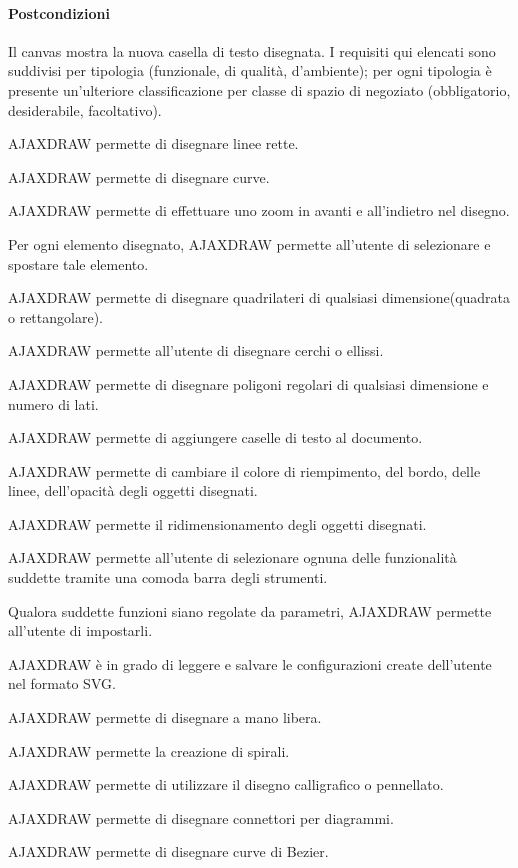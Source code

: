 \paragraph{Postcondizioni} Il canvas mostra la nuova casella di testo disegnata.
\label{listarequisiti}
I requisiti qui elencati sono suddivisi per tipologia (funzionale, di qualit\`a, d'ambiente); 
per ogni tipologia \`e presente un'ulteriore classificazione per classe di spazio di negoziato (obbligatorio, desiderabile, facoltativo). 
\begin{elenconumerato}{\subsubsecindent}
\item{AJAXDRAW permette di disegnare linee rette.}
\item{AJAXDRAW permette di disegnare curve.}
\item{AJAXDRAW permette di effettuare uno zoom in avanti e all'indietro nel disegno.}
\item{Per ogni elemento disegnato, AJAXDRAW permette all'utente di selezionare e spostare tale elemento.}
\item{AJAXDRAW permette di disegnare quadrilateri di qualsiasi dimensione(quadrata o rettangolare).}
\item{AJAXDRAW permette all'utente di disegnare cerchi o ellissi.}
\item{AJAXDRAW permette di disegnare poligoni regolari di qualsiasi dimensione e numero di lati.}
\item{AJAXDRAW permette di aggiungere caselle di testo al documento. }
\item{AJAXDRAW permette di cambiare il colore di riempimento, del bordo, delle linee, dell'opacità degli oggetti disegnati.}
\item{AJAXDRAW permette il ridimensionamento degli oggetti disegnati.}
\item{AJAXDRAW permette all'utente di selezionare ognuna delle funzionalit\`a suddette tramite una comoda barra degli strumenti.}
\item{Qualora suddette funzioni siano regolate da parametri, AJAXDRAW permette all'utente di impostarli.}
\item{AJAXDRAW \`e in grado di leggere e salvare le configurazioni create dell'utente nel formato SVG.}
\end{elenconumerato}

\begin{elenconumerato}{\subsubsecindent}
\item{AJAXDRAW permette di disegnare a mano libera.}
\item{AJAXDRAW permette la creazione di spirali.}
\item{AJAXDRAW permette di utilizzare il disegno calligrafico o pennellato.}
\item{AJAXDRAW permette di disegnare connettori per diagrammi.}
\item{AJAXDRAW permette di disegnare curve di Bezier.}
\end{elenconumerato}


